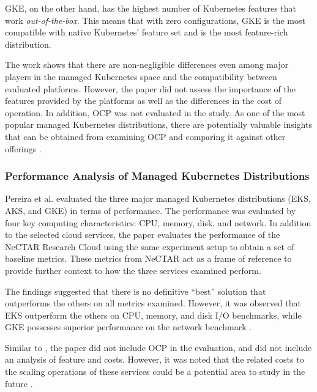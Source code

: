 GKE, on the other hand, has the highest number of Kubernetes features that work \textit{out-of-the-box}. This means that with zero configurations, GKE is the most compatible with native Kubernetes' feature set and is the most feature-rich distribution.

The work shows that there are non-negligible differences even among major players in the managed Kubernetes space and the compatibility between evaluated platforms. However, the paper did not assess the importance of the features provided by the platforms as well as the differences in the cost of operation. In addition, OCP was not evaluated in the study. As one of the most popular managed Kubernetes distributions, there are potentially valuable insights that can be obtained from examining OCP and comparing it against other offerings \cite{redhatinc.StateKubernetesSecurity2024, vrabicDigitalTwinsUnderstanding2018, portworxKubernetesAdoptionSurvey2021, broadcomStateKubernetes20232023}.


\subsubsection{Performance Analysis of Managed Kubernetes Distributions}

Pereira et al. \cite{pereiraferreiraPerformanceEvaluationContainers2019} evaluated the three major managed Kubernetes distributions (EKS, AKS, and GKE) in terms of performance. The performance was evaluated by four key computing characteristics: CPU, memory, disk, and network. In addition to the selected cloud services, the paper evaluates the performance of the NeCTAR Research Cloud using the same experiment setup to obtain a set of baseline metrics. These metrics from NeCTAR act as a frame of reference to provide further context to how the three services examined perform.

The findings suggested that there is no definitive ``best'' solution that outperforms the others on all metrics examined. However, it was observed that EKS outperform the others on CPU, memory, and disk I/O benchmarks, while GKE possesses superior performance on the network benchmark \cite{pereiraferreiraPerformanceEvaluationContainers2019}.

Similar to \cite{truyenManagingFeatureCompatibility2020}, the paper did not include OCP in the evaluation, and did not include an analysis of feature and costs. However, it was noted that the related costs to the scaling operations of these services could be a potential area to study in the future \cite{pereiraferreiraPerformanceEvaluationContainers2019}.


